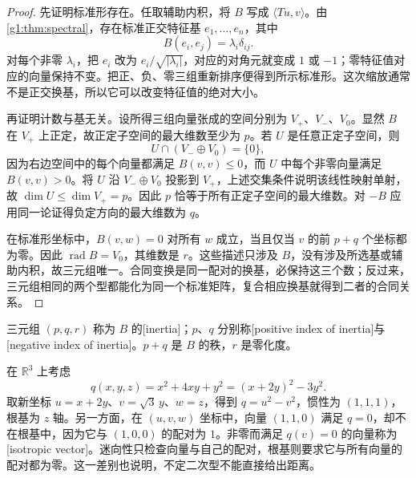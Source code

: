 \begin{proof}
	先证明标准形存在。任取辅助内积，将 \(B\) 写成 \(\langle Tu,v\rangle\)。由\cref{g1:thm:spectral}，存在标准正交特征基 \(e_1,\ldots,e_n\)，其中
	\[
		B(e_i,e_j)=\lambda_i\delta_{ij}.
	\]
	对每个非零 \(\lambda_i\)，把 \(e_i\) 改为 \(e_i/\sqrt{\lvert\lambda_i\rvert}\)，对应的对角元就变成 \(1\) 或 \(-1\)；零特征值对应的向量保持不变。把正、负、零三组重新排序便得到所示标准形。这次缩放通常不是正交换基，所以它可以改变特征值的绝对大小。

	再证明计数与基无关。设所得三组向量张成的空间分别为 \(V_+\)、\(V_-\)、\(V_0\)。显然 \(B\) 在 \(V_+\) 上正定，故正定子空间的最大维数至少为 \(p\)。若 \(U\) 是任意正定子空间，则
	\[
		U\cap(V_-\oplus V_0)=\{0\},
	\]
	因为右边空间中的每个向量都满足 \(B(v,v)\leq0\)，而 \(U\) 中每个非零向量满足 \(B(v,v)>0\)。将 \(U\) 沿 \(V_-\oplus V_0\) 投影到 \(V_+\)，上述交集条件说明该线性映射单射，故 \(\dim U\leq\dim V_+=p\)。因此 \(p\) 恰等于所有正定子空间的最大维数。对 \(-B\) 应用同一论证得负定方向的最大维数为 \(q\)。

	在标准形坐标中，\(B(v,w)=0\) 对所有 \(w\) 成立，当且仅当 \(v\) 的前 \(p+q\) 个坐标都为零。因此 \(\operatorname{rad}B=V_0\)，其维数是 \(r\)。这些描述只涉及 \(B\)，没有涉及所选基或辅助内积，故三元组唯一。合同变换是同一配对的换基，必保持这三个数；反过来，三元组相同的两个型都能化为同一个标准矩阵，复合相应换基就得到二者的合同关系。
\end{proof}

三元组 \((p,q,r)\) 称为 \(B\) 的[inertia]；\(p\)、\(q\) 分别称[positive index of inertia]与[negative index of inertia]。\(p+q\) 是 \(B\) 的秩，\(r\) 是零化度。

\begin{example}
	\label{g1:exm:isotropic-radical}
	在 \(\mathbb R^3\) 上考虑
	\[
		q(x,y,z)=x^2+4xy+y^2=(x+2y)^2-3y^2.
	\]
	取新坐标 \(u=x+2y\)、\(v=\sqrt3\,y\)、\(w=z\)，得到 \(q=u^2-v^2\)，惯性为 \((1,1,1)\)，根基为 \(z\) 轴。另一方面，在 \((u,v,w)\) 坐标中，向量 \((1,1,0)\) 满足 \(q=0\)，却不在根基中，因为它与 \((1,0,0)\) 的配对为 \(1\)。非零而满足 \(q(v)=0\) 的向量称为[isotropic vector]。迷向性只检查向量与自己的配对，根基则要求它与所有向量的配对都为零。这一差别也说明，不定二次型不能直接给出距离。
\end{example}

